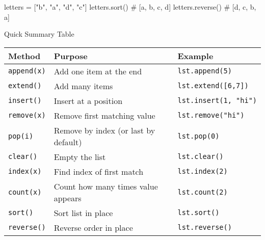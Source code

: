 \documentclass[
  letterpaper,
  DIV=11,
  numbers=noendperiod]{scrreprt}
\newenvironment{Shaded}{\begin{snugshade}}{\end{snugshade}}
\newcommand{\CommentTok}[1]{\textcolor[rgb]{0.37,0.37,0.37}{#1}}
\newcommand{\NormalTok}[1]{\textcolor[rgb]{0.00,0.23,0.31}{#1}}
\newcommand{\OperatorTok}[1]{\textcolor[rgb]{0.37,0.37,0.37}{#1}}
\newcommand{\StringTok}[1]{\textcolor[rgb]{0.13,0.47,0.30}{#1}}
\begin{document}
\begin{Shaded}
\begin{Highlighting}[]
\NormalTok{letters }\OperatorTok{=}\NormalTok{ [}\StringTok{"b"}\NormalTok{, }\StringTok{"a"}\NormalTok{, }\StringTok{"d"}\NormalTok{, }\StringTok{"c"}\NormalTok{]}
\NormalTok{letters.sort()       }\CommentTok{\# [\textquotesingle{}a\textquotesingle{}, \textquotesingle{}b\textquotesingle{}, \textquotesingle{}c\textquotesingle{}, \textquotesingle{}d\textquotesingle{}]}
\NormalTok{letters.reverse()    }\CommentTok{\# [\textquotesingle{}d\textquotesingle{}, \textquotesingle{}c\textquotesingle{}, \textquotesingle{}b\textquotesingle{}, \textquotesingle{}a\textquotesingle{}]}
\end{Highlighting}
\end{Shaded}

Quick Summary Table

\begin{longtable}[]{@{}
  >{\raggedright\arraybackslash}p{}
  >{\raggedright\arraybackslash}p{}
  >{\raggedright\arraybackslash}p{}@{}}
\toprule\noalign{}
\begin{minipage}[b]{\linewidth}\raggedright
Method
\end{minipage} & \begin{minipage}[b]{\linewidth}\raggedright
Purpose
\end{minipage} & \begin{minipage}[b]{\linewidth}\raggedright
Example
\end{minipage} \\
\midrule\noalign{}
\endhead
\bottomrule\noalign{}
\endlastfoot
\texttt{append(x)} & Add one item at the end & \texttt{lst.append(5)} \\
\texttt{extend()} & Add many items & \texttt{lst.extend({[}6,7{]})} \\
\texttt{insert()} & Insert at a position &
\texttt{lst.insert(1,\ "hi")} \\
\texttt{remove(x)} & Remove first matching value &
\texttt{lst.remove("hi")} \\
\texttt{pop(i)} & Remove by index (or last by default) &
\texttt{lst.pop(0)} \\
\texttt{clear()} & Empty the list & \texttt{lst.clear()} \\
\texttt{index(x)} & Find index of first match & \texttt{lst.index(2)} \\
\texttt{count(x)} & Count how many times value appears &
\texttt{lst.count(2)} \\
\texttt{sort()} & Sort list in place & \texttt{lst.sort()} \\
\texttt{reverse()} & Reverse order in place & \texttt{lst.reverse()} \\
\end{longtable}
\end{document}
